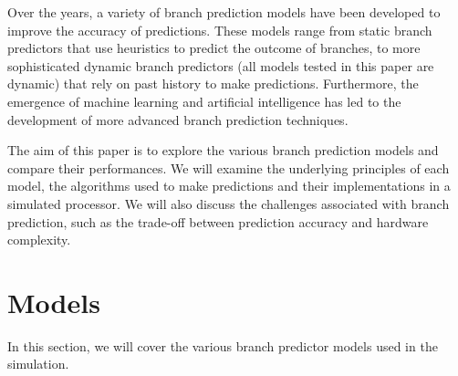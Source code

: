 \documentclass[conference]{IEEEtran}
\begin{document}
Over the years, a variety of branch prediction models have been developed to improve the accuracy of predictions. These models range from static branch predictors that use heuristics to predict the outcome of branches, to more sophisticated dynamic branch predictors (all models tested in this paper are dynamic) that rely on past history to make predictions. Furthermore, the emergence of  machine learning and artificial intelligence has led to the development of more advanced branch prediction techniques.

The aim of this paper is to explore the various branch prediction models and compare their performances. We will examine the underlying principles of each model, the algorithms used to make predictions and their implementations in a simulated processor. We will also discuss the challenges associated with branch prediction, such as the trade-off between prediction accuracy and hardware complexity.

\section{Models}
In this section, we will cover the various branch predictor models used in the simulation.
\end{document}

